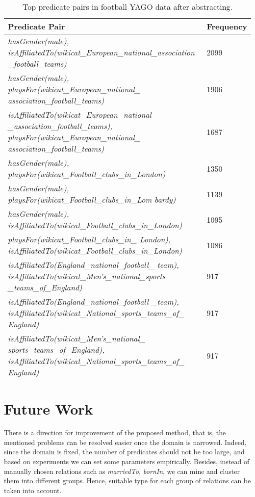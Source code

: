 \begin{table}[ht]
\caption{Top predicate pairs in football YAGO data after abstracting.}
\label{table6}
\begin{center}
\begin{tabular}{ |p{6cm}|p{1.5cm}| } 
\hline
Predicate Pair & Frequency\\
\hline
\textit{hasGender(male), isAffiliatedTo(wikicat\_European\_national\_association \_football\_teams)} & 2099\\
\hline
\textit{hasGender(male), playsFor(wikicat\_European\_national\_ association\_football\_teams)} & 1906\\
\hline
\textit{isAffiliatedTo(wikicat\_European\_national \_association\_football\_teams), playsFor(wikicat\_European\_national\_ association\_football\_teams)} & 1687\\
\hline
\textit{hasGender(male), playsFor(wikicat\_Football\_clubs\_in\_London)} & 1350\\
\hline
\textit{hasGender(male), playsFor(wikicat\_Football\_clubs\_in\_Lom bardy)} & 1139\\
\hline
\textit{hasGender(male), isAffiliatedTo(wikicat\_Football\_clubs\_in\_London)} & 1095\\
\hline
\textit{playsFor(wikicat\_Football\_clubs\_in\_ London), isAffiliatedTo(wikicat\_Football\_clubs\_in\_London)} & 1086\\
\hline
\textit{isAffiliatedTo(England\_national\_football\_ team), isAffiliatedTo(wikicat\_Men's\_national\_sports \_teams\_of\_England)} & 917\\
\hline
\textit{isAffiliatedTo(England\_national\_football \_team), isAffiliatedTo(wikicat\_National\_sports\_teams\_of\_ England)} & 917\\
\hline
\textit{isAffiliatedTo(wikicat\_Men's\_national\_ sports\_teams\_of\_England), isAffiliatedTo(wikicat\_National\_sports\_teams\_of\_ England)} & 917\\
\hline
\end{tabular}
\end{center}
\end{table}

\section{Future Work}
\label{section4}

There is a direction for improvement of the proposed method, that is, the mentioned problems can be resolved easier once the domain is narrowed. Indeed, since the domain is fixed, the number of predicates should not be too large, and based on experiments we can set some parameters empirically. Besides, instead of manually chosen relations such as \textit{marriedTo, bornIn}, we can mine and cluster them into different groups. Hence, suitable type for each group of relations can be taken into account.
